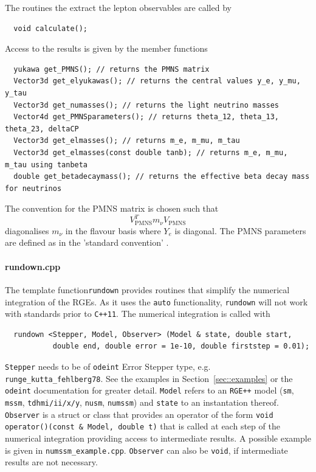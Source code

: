 \documentclass[11pt,a4paper]{article}
\begin{document}
The routines the extract the lepton observables are called by
\begin{lstlisting}
  void calculate();
\end{lstlisting}
Access to the results is given by the member functions
\begin{lstlisting}
  yukawa get_PMNS(); // returns the PMNS matrix
  Vector3d get_elyukawas(); // returns the central values y_e, y_mu, y_tau
  Vector3d get_numasses(); // returns the light neutrino masses
  Vector4d get_PMNSparameters(); // returns theta_12, theta_13, theta_23, deltaCP
  Vector3d get_elmasses(); // returns m_e, m_mu, m_tau
  Vector3d get_elmasses(const double tanb); // returns m_e, m_mu, m_tau using tanbeta
  double get_betadecaymass(); // returns the effective beta decay mass for neutrinos
\end{lstlisting}
The convention for the PMNS matrix is chosen such that
\begin{equation}
  V_{\mathrm{PMNS}}^T m_\nu V_{\mathrm{PMNS}}
\end{equation}
diagonalises $m_\nu$ in the flavour basis where $Y_e$ is diagonal. The PMNS parameters are defined as in the 'standard convention' \cite{Patrignani:2016xqp}.

\paragraph{rundown.cpp}
The template function\texttt{rundown} provides routines that simplify the numerical integration of the RGEs. As it uses the \texttt{auto} functionality, \texttt{rundown} will not work with standards prior to \texttt{C++11}. The numerical integration is called with
\begin{lstlisting}
  rundown <Stepper, Model, Observer> (Model & state, double start,
           double end, double error = 1e-10, double firststep = 0.01);
\end{lstlisting}
\texttt{Stepper} needs to be of \texttt{odeint} Error Stepper type, e.g. \texttt{runge\_kutta\_fehlberg78}. See the examples in Section~\ref{sec::examples} or the \texttt{odeint} documentation for greater detail. \texttt{Model} refers to an \texttt{RGE++} model (\texttt{sm}, \texttt{mssm}, \texttt{tdhmi/ii/x/y}, \texttt{nusm}, \texttt{numssm}) and \texttt{state} to an instantation thereof. \texttt{Observer} is a struct or class that provides an operator of the form \texttt{void operator()(const \& Model, double t)} that is called at each step of the numerical integration providing access to intermediate results. A possible example is given in \texttt{numssm\_example.cpp}. \texttt{Observer} can also be \texttt{void}, if intermediate results are not necessary.
\end{document}
